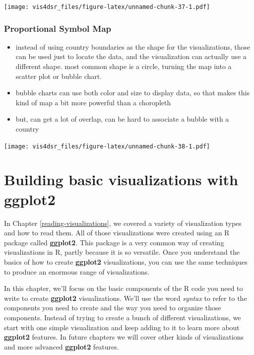 \documentclass[
]{krantz}
\providecommand{\tightlist}{%
  \setlength{\itemsep}{0pt}\setlength{\parskip}{0pt}}
\begin{document}
\texttt{[image: vis4dsr\_files/figure-latex/unnamed-chunk-37-1.pdf]}

\hypertarget{proportional-symbol-map}{%
\subsection{Proportional Symbol Map}\label{proportional-symbol-map}}

\begin{itemize}
\tightlist
\item
  instead of using country boundaries as the shape for the visualizations, those
  can be used just to locate the data, and the visualization can actually use a different
  shape. most common shape is a circle, turning the map into a scatter plot or bubble chart.
\item
  bubble charts can use both color and size to display data, so that makes this kind
  of map a bit more powerful than a choropleth
\item
  but, can get a lot of overlap, can be hard to associate a bubble with a country
\end{itemize}

\texttt{[image: vis4dsr\_files/figure-latex/unnamed-chunk-38-1.pdf]}

\hypertarget{building-basic-visualizations}{%
\chapter{Building basic visualizations with ggplot2}\label{building-basic-visualizations}}

In Chapter \ref{reading-visualizations}, we covered a variety of visualization types
and how to read them. All
of those visualizations were created using an R package called \textbf{ggplot2}. This
package is a very common way of creating visualizations in R, partly because it is
so versatile. Once you understand the basics of how to create \textbf{ggplot2} visualizations,
you can use the same techniques to produce an enormous range of visualizations.

In this chapter, we'll focus on the basic components of the R code you need to write
to create \textbf{ggplot2} visualizations. We'll use the word \emph{syntax} to refer to the
components you need to create and the way you need to organize those components.
Instead of trying to create a bunch of different visualizations, we start with one
simple visualization and keep adding to it to learn more about \textbf{ggplot2} features.
In future chapters we will cover other kinds of visualizations and more advanced
\textbf{ggplot2} features.
\end{document}
